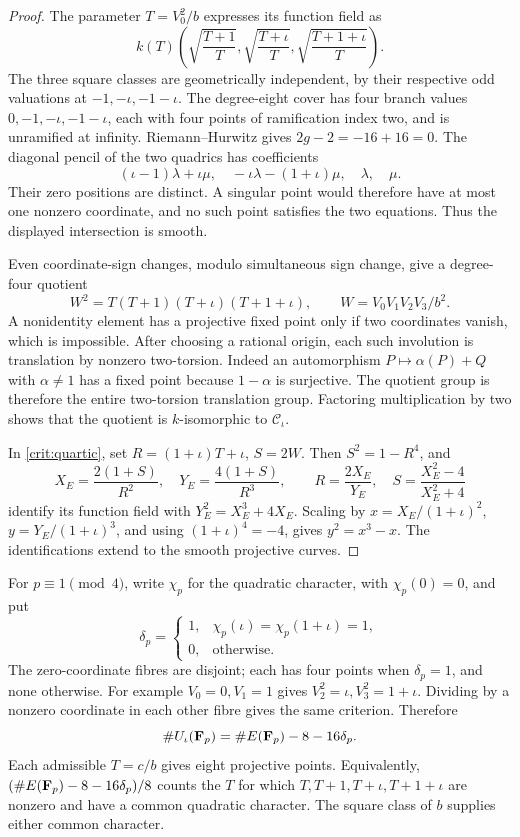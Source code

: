 \begin{proof}
The parameter \(T=V_0^2/b\) expresses its function field as
\[
 k(T)\left(\sqrt{\frac{T+1}{T}},\sqrt{\frac{T+\iota}{T}},
                  \sqrt{\frac{T+1+\iota}{T}}\right).
\]
The three square classes are geometrically independent, by their
respective odd valuations at \(-1,-\iota,-1-\iota\).
The degree-eight cover has four branch values
\(0,-1,-\iota,-1-\iota\), each with four points of ramification
index two, and is unramified at infinity. Riemann--Hurwitz gives
\(2g-2=-16+16=0\).
The diagonal pencil of the two quadrics has coefficients
\[
 (\iota-1)\lambda+\iota\mu,\quad
 -\iota\lambda-(1+\iota)\mu,\quad\lambda,\quad\mu.
\]
Their zero positions are distinct. A singular point would therefore
have at most one nonzero coordinate, and no such point satisfies the
two equations. Thus the displayed intersection is smooth.

Even coordinate-sign changes, modulo simultaneous sign change, give
a degree-four quotient
\begin{equation}\label{crit:quartic}
 W^2=T(T+1)(T+\iota)(T+1+\iota),\qquad
 W=V_0V_1V_2V_3/b^2.
\end{equation}
A nonidentity element has a projective fixed point only if two
coordinates vanish, which is impossible. After choosing a rational
origin, each such involution is translation by nonzero two-torsion.
Indeed an automorphism \(P\mapsto\alpha(P)+Q\) with
\(\alpha\ne1\) has a fixed point because \(1-\alpha\) is surjective.
The quotient group is therefore the entire two-torsion translation
group. Factoring multiplication by two shows that the quotient is
\(k\)-isomorphic to \(\mathcal C_\iota\).

In \eqref{crit:quartic}, set \(R=(1+\iota)T+\iota\), \(S=2W\).
Then \(S^2=1-R^4\), and
\[
 X_E=\frac{2(1+S)}{R^2},\quad Y_E=\frac{4(1+S)}{R^3},\qquad
 R=\frac{2X_E}{Y_E},\quad S=\frac{X_E^2-4}{X_E^2+4}
\]
identify its function field with \(Y_E^2=X_E^3+4X_E\).
Scaling by \(x=X_E/(1+\iota)^2\), \(y=Y_E/(1+\iota)^3\), and
using \((1+\iota)^4=-4\), gives \(y^2=x^3-x\).
The identifications extend to the smooth projective curves.
\end{proof}

For \(p\equiv1\pmod4\), write \(\chi_p\) for the quadratic
character, with \(\chi_p(0)=0\), and put
\[
 \delta_p=\begin{cases}
 1,&\chi_p(\iota)=\chi_p(1+\iota)=1,\\0,&\text{otherwise}.
 \end{cases}
\]
The zero-coordinate fibres are disjoint; each has four points when
\(\delta_p=1\), and none otherwise. For example \(V_0=0,V_1=1\)
gives \(V_2^2=\iota,V_3^2=1+\iota\). Dividing by a nonzero
coordinate in each other fibre gives the same criterion. Therefore
\begin{equation}\label{crit:count}
 \#U_\iota(\mathbf F_p)=\#E(\mathbf F_p)-8-16\delta_p.
\end{equation}
Each admissible \(T=c/b\) gives eight projective points. Equivalently,
\((\#E(\mathbf F_p)-8-16\delta_p)/8\) counts the \(T\) for which
\(T,T+1,T+\iota,T+1+\iota\) are nonzero and have a common quadratic
character. The square class of \(b\) supplies either common character.

